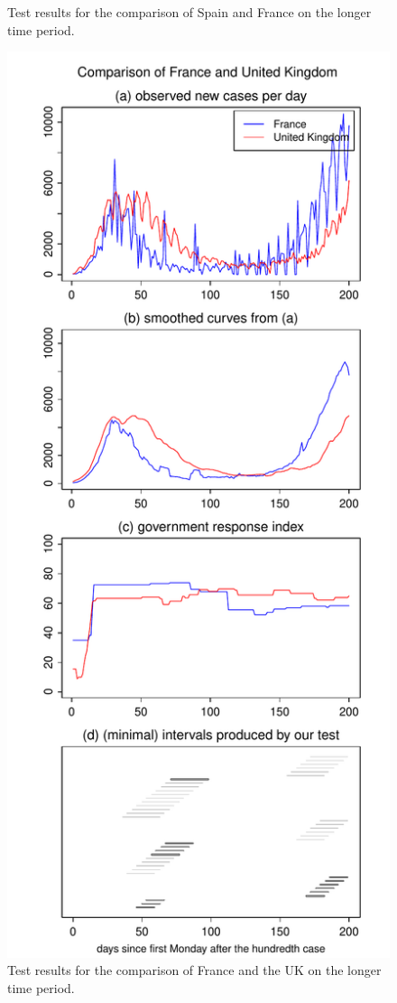 \documentclass[a4paper,12pt]{article}
\numberwithin{equation}{section}
\begin{document}
{\begin{figure}[p!]
\begin{minipage}[t]{0.49\textwidth}
\caption{Test results for the comparison of Spain and France on the longer time period.}
\end{minipage}
\hspace{0.25cm}
\begin{minipage}[t]{0.49\textwidth}
\includegraphics[width=\textwidth]{plots/FRA_vs_GBR_long}
\caption{Test results for the comparison of France and the UK on the longer time period.}\label{fig:supp3:last}
\end{minipage}
\end{figure}


}
\end{document}
